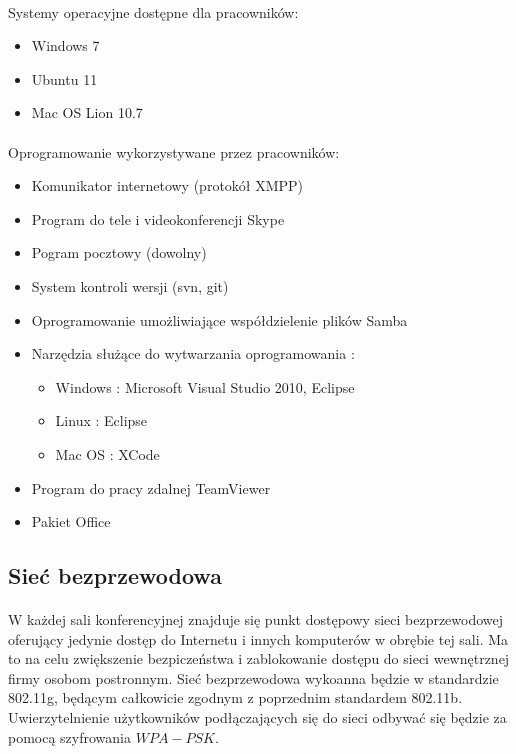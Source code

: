 \paragraph{}
Systemy operacyjne dostępne dla pracowników:
\begin{itemize}
  \item Windows 7
  \item Ubuntu 11
  \item Mac OS Lion 10.7
\end{itemize}

\paragraph{}
Oprogramowanie wykorzystywane przez pracowników:
\begin{itemize}
  \item Komunikator internetowy (protokół XMPP)
  \item Program do tele i videokonferencji Skype
  \item Pogram pocztowy (dowolny)
  \item System kontroli wersji (svn, git)
  \item Oprogramowanie umożliwiające współdzielenie plików Samba
  \item Narzędzia służące do wytwarzania oprogramowania : 
  \begin{itemize}
	\item Windows : Microsoft Visual Studio 2010, Eclipse
	\item Linux : Eclipse
	\item Mac OS : XCode
  \end{itemize}
  \item Program do pracy zdalnej TeamViewer
 \item Pakiet Office
\end{itemize}




\subsection{Sieć bezprzewodowa}
\paragraph{}
W każdej sali konferencyjnej znajduje się punkt dostępowy sieci bezprzewodowej  oferujący jedynie dostęp do Internetu i innych komputerów w obrębie tej sali. Ma to na celu zwiększenie bezpiczeństwa i zablokowanie dostępu do sieci wewnętrznej firmy osobom postronnym. Sieć bezprzewodowa wykoanna będzie w standardzie 802.11g, będącym całkowicie zgodnym z poprzednim standardem 802.11b. Uwierzytelnienie użytkowników podłączających się do sieci odbywać się będzie za pomocą szyfrowania $WPA-PSK$.
